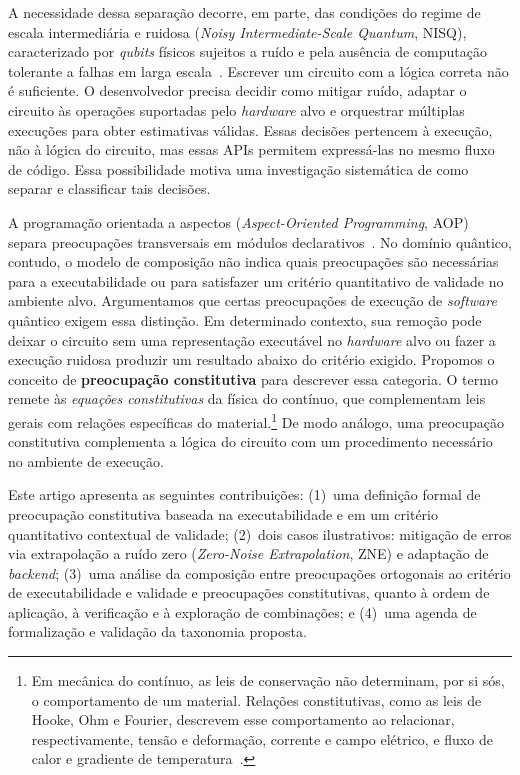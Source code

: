 \documentclass[sigconf]{acmart}
\begin{document}
A necessidade dessa separação decorre, em parte, das condições do regime de escala intermediária e ruidosa (\textit{Noisy Intermediate-Scale Quantum}, NISQ), caracterizado por \textit{qubits} físicos sujeitos a ruído e pela ausência de computação tolerante a falhas em larga escala~\cite{preskill2018}. Escrever um circuito com a lógica correta não é suficiente. O desenvolvedor precisa decidir como mitigar ruído, adaptar o circuito às operações suportadas pelo \textit{hardware} alvo e orquestrar múltiplas execuções para obter estimativas válidas. Essas decisões pertencem à execução, não à lógica do circuito, mas essas APIs permitem expressá-las no mesmo fluxo de código. Essa possibilidade motiva uma investigação sistemática de como separar e classificar tais decisões.

A programação orientada a aspectos (\textit{Aspect-Oriented Programming}, AOP) separa preocupações transversais em módulos declarativos~\cite{kiczales1997}. No domínio quântico, contudo, o modelo de composição não indica quais preocupações são necessárias para a executabilidade ou para satisfazer um critério quantitativo de validade no ambiente alvo. Argumentamos que certas preocupações de execução de \textit{software} quântico exigem essa distinção. Em determinado contexto, sua remoção pode deixar o circuito sem uma representação executável no \textit{hardware} alvo ou fazer a execução ruidosa produzir um resultado abaixo do critério exigido. Propomos o conceito de \textbf{preocupação constitutiva} para descrever essa categoria. O termo remete às \emph{equações constitutivas} da física do contínuo, que complementam leis gerais com relações específicas do material.\footnote{Em mecânica do contínuo, as leis de conservação não determinam, por si sós, o comportamento de um material. Relações constitutivas, como as leis de Hooke, Ohm e Fourier, descrevem esse comportamento ao relacionar, respectivamente, tensão e deformação, corrente e campo elétrico, e fluxo de calor e gradiente de temperatura~\cite{truesdell2004}.} De modo análogo, uma preocupação constitutiva complementa a lógica do circuito com um procedimento necessário no ambiente de execução.

Este artigo apresenta as seguintes contribuições: (1)~uma definição formal de preocupação constitutiva baseada na executabilidade e em um critério quantitativo contextual de validade; (2)~dois casos ilustrativos: mitigação de erros via extrapolação a ruído zero (\textit{Zero-Noise Extrapolation}, ZNE) e adaptação de \textit{backend}; (3)~uma análise da composição entre preocupações ortogonais ao critério de executabilidade e validade e preocupações constitutivas, quanto à ordem de aplicação, à verificação e à exploração de combinações; e (4)~uma agenda de formalização e validação da taxonomia proposta.
\end{document}
